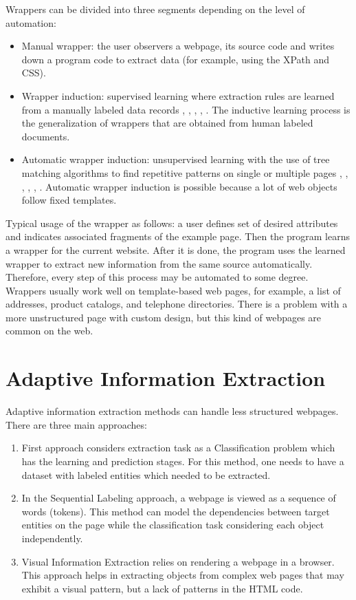 \noindent Wrappers can be divided into three segments depending on the level of automation:
\begin{itemize}
    \item Manual wrapper: the user observers a webpage, its source code and writes down a program code to extract data (for example, using the XPath and CSS).
    \item Wrapper induction: supervised learning where extraction rules are learned from a manually labeled data records \cite{Hsu}, \cite{BotUp}, \cite{Stalker}, \cite{Wien}, \cite{Rapier}\cite{SRV}\cite{Vide}. The inductive learning process is the generalization of wrappers that are obtained from human labeled documents. 
    \item Automatic wrapper induction: unsupervised learning with the use of tree matching algorithms to find repetitive patterns on single or multiple pages \cite{Qiu}, \cite{Dalvi}, \cite{Diadem}, \cite{Roadrunner}, \cite{LiuMinData}, \cite{Urest}. Automatic wrapper induction is possible because a lot of web objects follow fixed templates.
\end{itemize}

Typical usage of the wrapper as follows: a user defines set of desired attributes and indicates associated fragments of the example page. Then the program learns a wrapper for the current website. After it is done, the program uses the learned wrapper to extract new information from the same source automatically. Therefore, every step of this process may be automated to some degree. \\

Wrappers usually work well on template-based web pages, for example, a list of addresses, product catalogs, and telephone directories. There is a problem with a more unstructured page with custom design, but this kind of webpages are common on the web.

\section{Adaptive Information Extraction}

Adaptive information extraction methods can handle less structured webpages. There are three main approaches:

\begin{enumerate}
    \item First approach considers extraction task as a Classification problem which has the learning and prediction stages. For this method, one needs to have a dataset with labeled entities which needed to be extracted. 
    \item In the Sequential Labeling approach, a webpage is viewed as a sequence of words (tokens). This method can model the dependencies between target entities on the page while the classification task considering each object independently.
    \item Visual Information Extraction relies on rendering a webpage in a browser. This approach helps in extracting objects from complex web pages that may exhibit a visual pattern, but a lack of patterns in the HTML code.
\end{enumerate}


